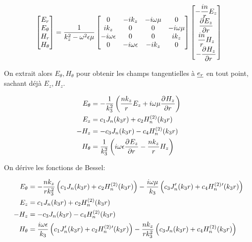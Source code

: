     \begin{equation}
        \begin{bmatrix}
            E_r\\
            E_\theta\\
            H_r\\
            H_\theta
        \end{bmatrix} =
        \frac{1}{k_z^2 - \w^2\eps\mu}
        \begin{bmatrix}
        0 & -ik_z & -i\w\mu & 0 
        \\
        ik_z & 0 & 0 & -i\w\mu
        \\
        -i\w\eps & 0 & 0 & ik_z
        \\
        0 & -i\w\eps & -ik_z & 0
        \end{bmatrix}
        \begin{bmatrix}
            -\frac{in}{r}E_z\\
            \ddr{r}{E_z}\\
            \frac{in}{r}H_z\\
            -\ddr{r}{H_z}
        \end{bmatrix}
    \end{equation}

    On extrait alors $E_\theta, H_\theta$ pour obtenir les champs tangentielles à $\v{e_r}$ en tout point, sachant déjà $E_z, H_z$.

    \begin{align}
        E_\theta &= -\frac{1}{k_3^2}\left(\frac{nk_z}{r}E_z + i\w\mu\ddr{r}{H_z}\right)
        \\
        E_z &= c_1 J_n(k_3 r) + c_2 H_n^{(2)}(k_3 r)
        \\
        -H_z &= -c_3 J_n(k_3 r) - c_4 H_n^{(2)}(k_3 r)
        \\
        H_\theta &= \frac{1}{k_3^2}\left(i\w\eps\ddr{r}{E_z} - \frac{nk_z}{r}H_z\right)
    \end{align}

    On dérive les fonctions de Bessel:

   \begin{align}
        E_\theta &= -\frac{nk_z}{rk_3^2}\left(c_1J_n(k_3r) + c_2 H_n^{(2)}(k_3r)\right) - \frac{i\w\mu}{k_3}\left(c_3J_n'(k_3r) + c_4 H_n^{(2)}{}'(k_3r)\right)
        \\
        E_z &= c_1 J_n(k_3 r) + c_2 H_n^{(2)}(k_3 r)
        \\
        -H_z &= -c_3 J_n(k_3 r) - c_4 H_n^{(2)}(k_3 r)
        \\
        H_\theta &= \frac{i\w\eps}{k_3}\left(c_1J_n'(k_3r) + c_2 H_n^{(2)}{}'(k_3r)\right) - \frac{nk_z}{rk_3^2}\left(c_3J_n(k_3r) + c_4 H_n^{(2)}(k_3r)\right)
    \end{align}

